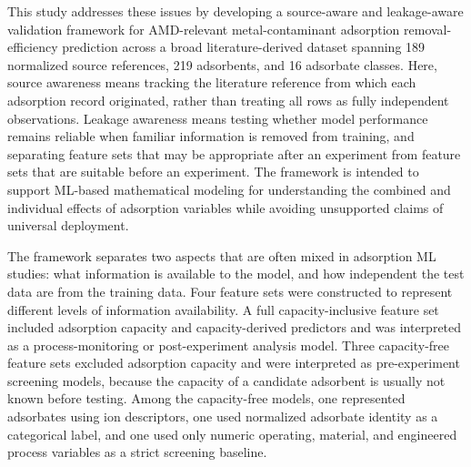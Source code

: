 \documentclass[review,12pt,number]{elsarticle}
\begin{document}
This study addresses these issues by developing a source-aware and leakage-aware validation framework for AMD-relevant metal-contaminant adsorption removal-efficiency prediction across a broad literature-derived dataset spanning 189 normalized source references, 219 adsorbents, and 16 adsorbate classes. Here, source awareness means tracking the literature reference from which each adsorption record originated, rather than treating all rows as fully independent observations. Leakage awareness means testing whether model performance remains reliable when familiar information is removed from training, and separating feature sets that may be appropriate after an experiment from feature sets that are suitable before an experiment. The framework is intended to support ML-based mathematical modeling for understanding the combined and individual effects of adsorption variables while avoiding unsupported claims of universal deployment.

The framework separates two aspects that are often mixed in adsorption ML studies: what information is available to the model, and how independent the test data are from the training data. Four feature sets were constructed to represent different levels of information availability. A full capacity-inclusive feature set included adsorption capacity and capacity-derived predictors and was interpreted as a process-monitoring or post-experiment analysis model. Three capacity-free feature sets excluded adsorption capacity and were interpreted as pre-experiment screening models, because the capacity of a candidate adsorbent is usually not known before testing. Among the capacity-free models, one represented adsorbates using ion descriptors, one used normalized adsorbate identity as a categorical label, and one used only numeric operating, material, and engineered process variables as a strict screening baseline.
\end{document}
